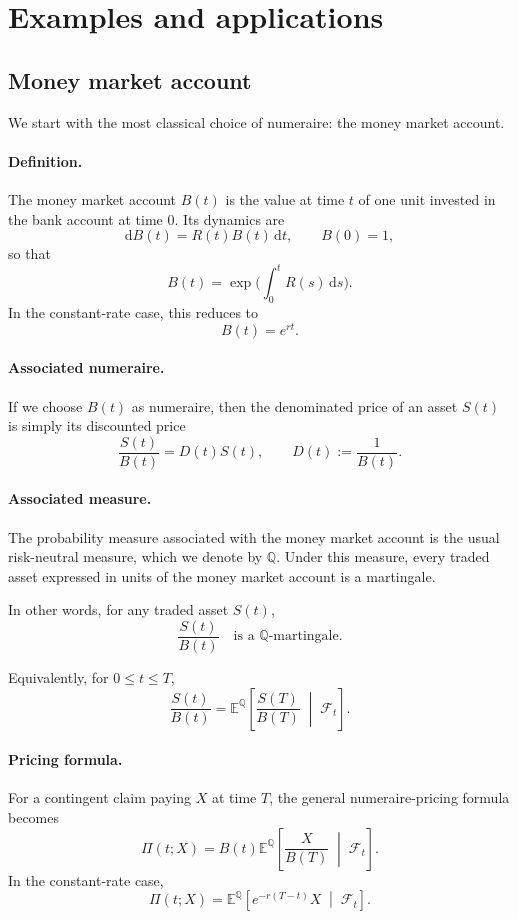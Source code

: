\documentclass[11pt]{article}
\newcommand{\Qbb}{\mathbb{Q}}
\newcommand{\E}{\mathbb{E}}
\theoremstyle{definition}
\theoremstyle{plain}
\begin{document}
\section{Examples and applications}


\subsection{Money market account}

We start with the most classical choice of numeraire: the money market
account.

\paragraph{Definition.}
The money market account \(B(t)\) is the value at time \(t\) of one unit
invested in the bank account at time \(0\).
Its dynamics are
\[
\mathrm{d}B(t)=R(t)B(t)\,\mathrm{d}t,
\qquad B(0)=1,
\]
so that
\[
B(t)=\exp\!\Big(\int_0^t R(s)\,\mathrm{d}s\Big).
\]
In the constant-rate case, this reduces to
\[
B(t)=e^{rt}.
\]

\paragraph{Associated numeraire.}
If we choose \(B(t)\) as numeraire, then the denominated price of an
asset \(S(t)\) is simply its discounted price
\[
\frac{S(t)}{B(t)}=D(t)S(t),
\qquad D(t):=\frac1{B(t)}.
\]

\paragraph{Associated measure.}
The probability measure associated with the money market account is the
usual risk-neutral measure, which we denote by \(\Qbb\).
Under this measure, every traded asset expressed in units of the money
market account is a martingale.

In other words, for any traded asset \(S(t)\),
\[
\frac{S(t)}{B(t)}
\quad\text{is a }\Qbb\text{-martingale.}
\]

Equivalently, for \(0\le t\le T\),
\[
\frac{S(t)}{B(t)}
=
\E^\Qbb\!\left[
\frac{S(T)}{B(T)}
\;\middle|\;
\mathcal{F}_t
\right].
\]

\paragraph{Pricing formula.}
For a contingent claim paying \(X\) at time \(T\), the general
numeraire-pricing formula becomes
\[
\Pi(t;X)
=
B(t)\E^\Qbb\!\left[
\frac{X}{B(T)}
\;\middle|\;
\mathcal{F}_t
\right].
\]
In the constant-rate case,
\[
\boxed{
\Pi(t;X)
=
\E^\Qbb\!\left[
e^{-r(T-t)}X
\;\middle|\;
\mathcal{F}_t
\right].
}
\]
\end{document}

